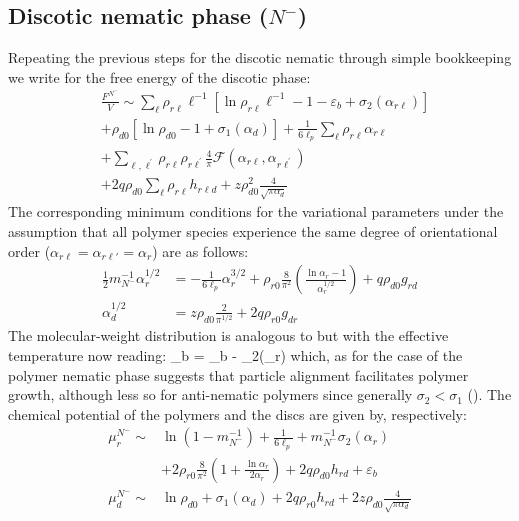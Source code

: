 \subsection{Discotic nematic phase ($N^{-}$)}

Repeating the previous steps for the discotic nematic through simple bookkeeping we write for the free energy of the discotic phase:
\begin{align}
   & \frac{F^{N^{-}}}{V}  \sim  \sum_{\ell }  \rho_{r \ell} \ell^{-1}  \left [ \ln \rho_{r \ell} \ell^{-1}  -1 - \varepsilon_{b}  +\sigma_{2} (\alpha_{r \ell})  \right ] \nonumber \\
   & + \rho_{d0} [ \ln \rho_{d0} -1 + \sigma_{1}(\alpha_{d})  ] + \frac{1}{6\ell_{p}} \sum_{\ell } \rho_{r \ell} \alpha_{r \ell} \nonumber \\ 
   & + \sum_{\ell,\ell^{\prime}} \rho_{r \ell} \rho_{r \ell^{\prime}} 
    \frac{4}{\pi} {\mathcal F} (\alpha_{r \ell}, \alpha_{r \ell^{\prime}}) \nonumber \\
    & + 2 q \rho_{d0} \sum_{\ell} \rho_{r \ell}  h_{r\ell d} + z \rho_{d0}^{2} \frac{4} {\sqrt{ \pi \alpha_{d}}}
\end{align}
The corresponding minimum conditions for the variational parameters under the assumption that all polymer species experience the same degree of orientational order ($\alpha_{r \ell} = \alpha_{r \ell \prime} = \alpha_{r}$) are as follows: 
\begin{align}
     \frac{1}{2} m_{N^{-}}^{-1}  \alpha_{r }^{1/2} &=  - \frac{1}{6\ell_{p}} \alpha_{r }^{3/2} +  \rho_{r0}  \frac{8}{\pi^{2}} 
    \left ( \frac{\ln  \alpha_{r} - 1}{\alpha_{r}^{1/2}} \right )   + q \rho_{d0}  g_{rd} \nonumber \\
 \alpha_{d}^{1/2} &=  z \rho_{d0} \frac{2}{\pi^{1/2}}  + 2 q \rho_{r0} g_{dr}
 \label{alphamin}
\end{align}
The molecular-weight distribution is  analogous to  but with the effective temperature now reading:
\beq
\tilde{\varepsilon}_{b} = \varepsilon_{b} - \sigma_{2}(\alpha_{r}) 
\label{tempnmin}
\eeq
which, as for the case of the polymer nematic phase suggests that particle alignment facilitates polymer growth, although less so for anti-nematic polymers since generally $\sigma_{2}  < \sigma_{1}$ ().  The chemical potential of the polymers and the discs are given by, respectively:
\begin{align}
 \mu_{r}^{N^{-}}   \sim  
& \ln ( 1 - m_{N^{-}}^{-1}) + \frac{1}{6 \ell_{p}}  +  m_{N^{-}}^{-1} \sigma_{2}(\alpha_{r})  \nonumber \\
& + 2  \rho_{r0} 
\frac{8}{\pi^{2}} \left ( 1+ \frac{\ln \alpha_{r}}{2 \alpha_{r}} \right )
+   2 q \rho_{d0}  h_{rd}
+ \varepsilon_{b} \nonumber \\
 \mu_{d}^{N^{-}}  \sim  & \ln \rho_{d0}  + \sigma_{1}(\alpha_{d})  +   2 q \rho_{r0}  
h_{rd} + 2 z \rho_{d0}  \frac{4} {\sqrt{ \pi \alpha_{d}}}
\end{align}
